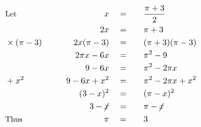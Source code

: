 \begin{alignat*}{7}
&\small\text{Let}&x\quad&=\quad&&\frac{\pi+3}{2}\\
&\,&2x\quad&=&&\pi+3\\
&\small\times(\pi-3)\qquad&2x(\pi-3)\quad&=&&(\pi+3)(\pi-3)\\
&\,&2\pi x-6x\quad&=&&\pi^2-9\\
&\,&9-6x\quad&=&&\pi^2-2\pi x\\
&\small+x^2&9-6x+x^2\quad&=&&\pi^2-2\pi x+x^2\\
&\,&(3-x)^2\quad&=&&(\pi-x)^2\\
&\,&3-\cancel{x}\quad&=&&\pi-\cancel{x}\\
&\small\text{Thus}&\pi\quad&=&&3
\end{alignat*}
